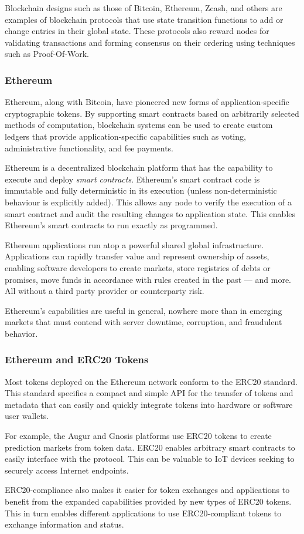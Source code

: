 Blockchain designs such as those of Bitcoin, Ethereum, Zcash, and others are examples of blockchain protocols that use state transition functions to add or change entries in their global state. These protocols also reward nodes for validating transactions and forming consensus on their ordering using techniques such as Proof-Of-Work\cite{44}.

\subsubsection{Ethereum}
Ethereum\cite{ethereum}, along with Bitcoin\cite{nakamoto2008bitcoin}, have pioneered new forms of application-specific cryptographic tokens\cite{AppCoins}. By supporting smart contracts based on arbitrarily selected methods of computation, blockchain systems can be used to create custom ledgers that provide application-specific capabilities such as voting, administrative functionality, and fee payments.

Ethereum is a decentralized blockchain platform that has the capability to execute and deploy \textit{smart contracts}. Ethereum's smart contract code is immutable and fully deterministic in its execution (unless non-deterministic behaviour is explicitly added). This allows any node to verify the execution of a smart contract and audit the resulting changes to application state. This enables Ethereum's smart contracts to run exactly as programmed.

Ethereum applications run atop a powerful shared global infrastructure. Applications can rapidly transfer value and represent ownership of assets, enabling software developers to create markets, store registries of debts or promises, move funds in accordance with rules created in the past — and more. All without a third party provider or counterparty risk.

Ethereum's capabilities are useful in general, nowhere more than in emerging markets that must contend with server downtime, corruption, and fraudulent behavior.

\subsubsection{Ethereum and \tOM{} ERC20 Tokens}
Most tokens deployed on the Ethereum network conform to the ERC20 standard\cite{ERC20}. This standard specifies a compact and simple API for the transfer of tokens and metadata that can easily and quickly integrate tokens into hardware or software user wallets.

For example, the Augur\cite{Augur} and Gnosis\cite{Gnosis} platforms use ERC20 tokens to create prediction markets from token data. ERC20 enables arbitrary smart contracts to easily interface with the \orchid{} protocol. This can be valuable to IoT devices seeking to securely access Internet endpoints.

ERC20-compliance also makes it easier for token exchanges and applications to benefit from the expanded capabilities provided by new types of ERC20 tokens. This in turn enables different applications to use ERC20-compliant tokens to exchange information and status.
